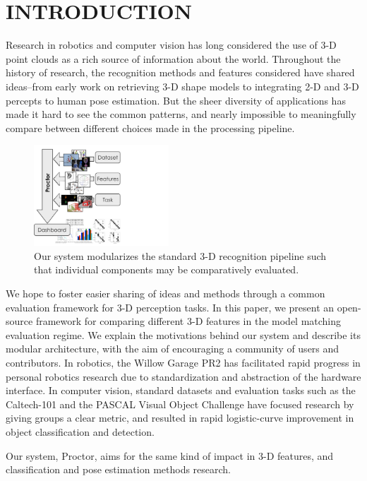 \section{INTRODUCTION}
Research in robotics and computer vision has long considered the use of 3-D point clouds as a rich source of information about the world.
Throughout the history of research, the recognition methods and features considered have shared ideas--from early work on retrieving 3-D shape models to integrating 2-D and 3-D percepts to human pose estimation.
But the sheer diversity of applications has made it hard to see the common patterns, and nearly impossible to meaningfully compare between different choices made in the processing pipeline.

\begin{figure}[thpb]
   \centering
   \includegraphics[width=0.45\textwidth]{../figures/figure1.pdf}
   \caption{Our system modularizes the standard 3-D recognition pipeline such that individual components may be comparatively evaluated.}
   \label{fig:figure1}
\end{figure}

We hope to foster easier sharing of ideas and methods through a common evaluation framework for 3-D perception tasks.
In this paper, we present an open-source framework for comparing different 3-D features in the model matching evaluation regime.
We explain the motivations behind our system and describe its modular architecture, with the aim of encouraging a community of users and contributors.
In robotics, the Willow Garage PR2 has facilitated rapid progress in personal robotics research due to standardization and abstraction of the hardware interface.
In computer vision, standard datasets and evaluation tasks such as the Caltech-101 \cite{FeiFei2007a} and the PASCAL Visual Object Challenge \cite{pascal-voc-2010} have focused research by giving groups a clear metric, and resulted in rapid logistic-curve improvement in object classification and detection.

Our system, Proctor, aims for the same kind of impact in 3-D features, and classification and pose estimation methods research.


